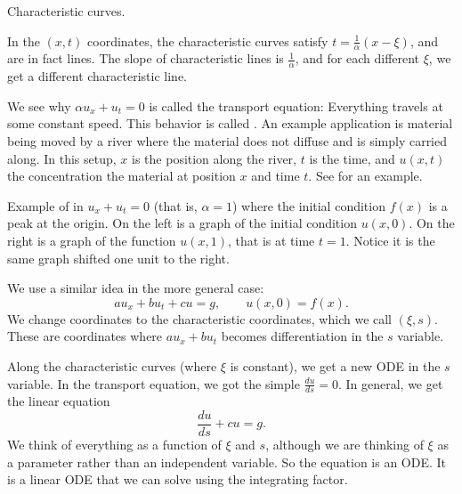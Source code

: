 \begin{example}
\begin{mywrapfig}{2.8in}
\capstart
{}
\caption{Characteristic curves.\label{fopde:charcurves}}
\end{mywrapfig}

In the $(x,t)$ coordinates, the characteristic curves satisfy 
$t = \frac{1}{\alpha} ( x- \xi)$, and are in fact lines.
The slope of characteristic lines is
$\frac{1}{\alpha}$, and for each different $\xi$, we get a different
characteristic line.

We see why $\alpha u_x + u_t = 0$ is called the
transport equation: Everything travels at some constant speed.
This behavior is called \emph{}.
An example application is material being moved by a river where the material
does not diffuse and is simply carried along.  In this setup, $x$ is 
the position along the river, $t$ is the time, and $u(x,t)$ the concentration the
material at position $x$ and time $t$.  See
 for an example.
\begin{myfig}
\capstart
\caption{Example of 
in $u_x+u_t = 0$ (that is, $\alpha = 1$) where the
initial condition $f(x)$ is a peak at the origin.  On the left is a graph
of the initial condition $u(x,0)$.  On the right is a graph of
the function $u(x,1)$, that is at time $t=1$.  Notice it is the same
graph shifted one unit to
the right.\label{fopde:transportfig}}
\end{myfig}
\end{example}

We use a similar idea in the more general case:
\begin{equation*}
a u_x + b u_t + c u = g, \qquad u(x,0) = f(x)  .
\end{equation*}
We change coordinates to the
characteristic coordinates, which we call $(\xi,s)$.
These are coordinates where $a u_x + b u_t$ becomes differentiation
in the $s$ variable.

Along the characteristic curves (where $\xi$ is constant), we get a
new ODE in the $s$ variable.  In the transport
equation, we got the simple $\frac{du}{ds} = 0$.  In general,
we get the linear equation
\begin{equation} \label{eq:fopde:charode}
\frac{du}{ds} + c u = g.
\end{equation}
We think of everything as a function of $\xi$ and $s$,
although
we are thinking of $\xi$ as a parameter rather than an independent variable.
So the equation is an ODE\@.  It is a linear
ODE that we can solve using the integrating factor.

